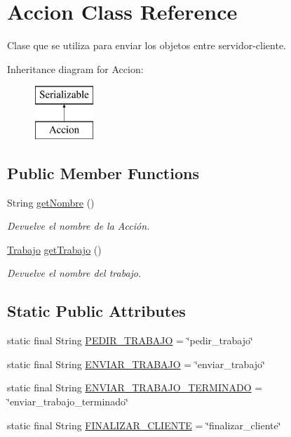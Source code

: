 \hypertarget{classAccion}{}\section{Accion Class Reference}
\label{classAccion}


Clase que se utiliza para enviar los objetos entre servidor-\/cliente.  


Inheritance diagram for Accion\+:\begin{figure}[H]
\begin{center}
\leavevmode
\includegraphics[height=2.000000cm]{classAccion}
\end{center}
\end{figure}
\subsection*{Public Member Functions}
\begin{DoxyCompactItemize}
\item 
String \hyperlink{classAccion_afbfc4ab0e3d6afe55075d7eb208c3a60}{get\+Nombre} ()
\begin{DoxyCompactList}\small\item\em Devuelve el nombre de la Acción. \end{DoxyCompactList}\item 
\hyperlink{classTrabajo}{Trabajo} \hyperlink{classAccion_ab299d4aa106c451865e68625ee9a2fa0}{get\+Trabajo} ()
\begin{DoxyCompactList}\small\item\em Devuelve el nombre del trabajo. \end{DoxyCompactList}\end{DoxyCompactItemize}
\subsection*{Static Public Attributes}
\begin{DoxyCompactItemize}
\item 
static final String \hyperlink{classAccion_ad8679a8a5a559e0b470231fc4c98147b}{P\+E\+D\+I\+R\+\_\+\+T\+R\+A\+B\+A\+JO} = \char`\"{}pedir\+\_\+trabajo\char`\"{}
\item 
static final String \hyperlink{classAccion_a41ff7a23c839af375260089e58ce9147}{E\+N\+V\+I\+A\+R\+\_\+\+T\+R\+A\+B\+A\+JO} = \char`\"{}enviar\+\_\+trabajo\char`\"{}
\item 
static final String \hyperlink{classAccion_a21c4e74abea5d8e84d961913979d0389}{E\+N\+V\+I\+A\+R\+\_\+\+T\+R\+A\+B\+A\+J\+O\+\_\+\+T\+E\+R\+M\+I\+N\+A\+DO} = \char`\"{}enviar\+\_\+trabajo\+\_\+terminado\char`\"{}
\item 
static final String \hyperlink{classAccion_a8c4e3447d220ea6ef7d29799f7ef2024}{F\+I\+N\+A\+L\+I\+Z\+A\+R\+\_\+\+C\+L\+I\+E\+N\+TE} = \char`\"{}finalizar\+\_\+cliente\char`\"{}
\end{DoxyCompactItemize}


